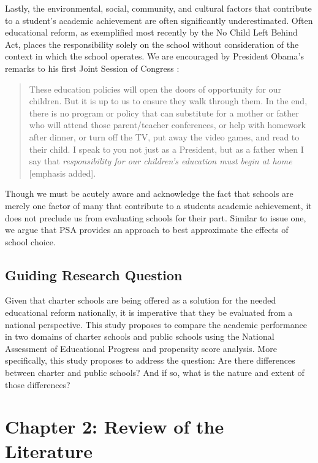 \documentclass[letterpaper,12p,twoside]{article} %
\begin{document}
Lastly, the environmental, social, community, and cultural factors that contribute to a student's academic achievement are often significantly underestimated. Often educational reform, as exemplified most recently by the No Child Left Behind Act, places the responsibility solely on the school without consideration of the context in which the school operates. We are encouraged by President Obama's remarks to his first Joint Session of Congress \cite{obama}:

\begin{quote}
These education policies will open the doors of opportunity for our children. But it is up to us to ensure they walk through them. In the end, there is no program or policy that can substitute for a mother or father who will attend those parent/teacher conferences, or help with homework after dinner, or turn off the TV, put away the video games, and read to their child. I speak to you not just as a President, but as a father when I say that \textit{responsibility for our children's education must begin at home} [emphasis added].
\end{quote}

\noindent Though we must be acutely aware and acknowledge the fact that schools are merely one factor of many that contribute to a students academic achievement, it does not preclude us from evaluating schools for their part. Similar to issue one, we argue that PSA provides an approach to best approximate the effects of school choice.

\subsection{Guiding Research Question}
Given that charter schools are being offered as a solution for the needed educational reform nationally, it is imperative that they be evaluated from a national perspective. This study proposes to compare the academic performance in two domains of charter schools and public schools using the National Assessment of Educational Progress and propensity score analysis. More specifically, this study proposes to address the question: Are there differences between charter and public schools? And if so, what is the nature and extent of those differences?



\cleardoublepage
\section{Chapter 2: Review of the Literature}
\end{document}
